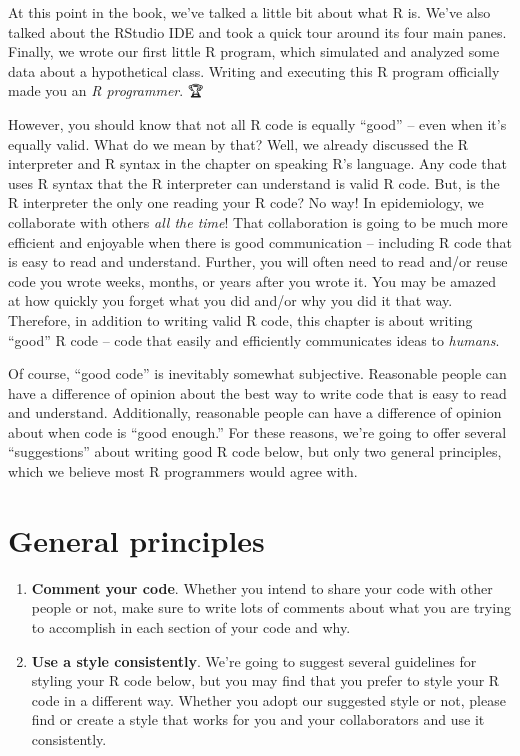 \documentclass[
  letterpaper,
  DIV=11,
  numbers=noendperiod]{scrreprt}
\begin{document}
At this point in the book, we've talked a little bit about what R is.
We've also talked about the RStudio IDE and took a quick tour around its
four main panes. Finally, we wrote our first little R program, which
simulated and analyzed some data about a hypothetical class. Writing and
executing this R program officially made you an \emph{R programmer}. 🏆

However, you should know that not all R code is equally ``good'' -- even
when it's equally valid. What do we mean by that? Well, we already
discussed the R interpreter and R syntax in the chapter on speaking R's
language. Any code that uses R syntax that the R interpreter can
understand is valid R code. But, is the R interpreter the only one
reading your R code? No way! In epidemiology, we collaborate with others
\emph{all the time}! That collaboration is going to be much more
efficient and enjoyable when there is good communication -- including R
code that is easy to read and understand. Further, you will often need
to read and/or reuse code you wrote weeks, months, or years after you
wrote it. You may be amazed at how quickly you forget what you did
and/or why you did it that way. Therefore, in addition to writing valid
R code, this chapter is about writing ``good'' R code -- code that
easily and efficiently communicates ideas to \emph{humans}.

Of course, ``good code'' is inevitably somewhat subjective. Reasonable
people can have a difference of opinion about the best way to write code
that is easy to read and understand. Additionally, reasonable people can
have a difference of opinion about when code is ``good enough.'' For
these reasons, we're going to offer several ``suggestions'' about
writing good R code below, but only two general principles, which we
believe most R programmers would agree with.

\section{General principles}\label{general-principles}

\begin{enumerate}
\def\labelenumi{\arabic{enumi}.}
\item
  \textbf{Comment your code}. Whether you intend to share your code with
  other people or not, make sure to write lots of comments about what
  you are trying to accomplish in each section of your code and why.
\item
  \textbf{Use a style consistently}. We're going to suggest several
  guidelines for styling your R code below, but you may find that you
  prefer to style your R code in a different way. Whether you adopt our
  suggested style or not, please find or create a style that works for
  you and your collaborators and use it consistently.
\end{enumerate}
\end{document}
